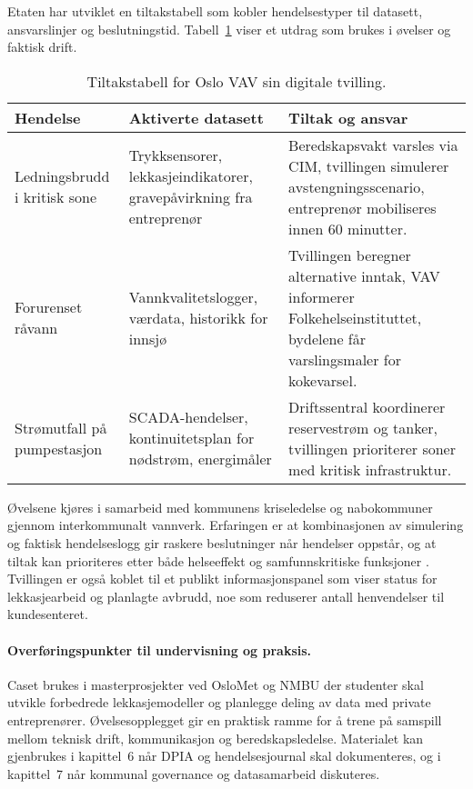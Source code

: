 Etaten har utviklet en tiltakstabell som kobler hendelsestyper til datasett, ansvarslinjer og beslutningstid. Tabell~\ref{tab:kap03-oslo-vav}
viser et utdrag som brukes i øvelser og faktisk drift.

\begin{table}[ht]
    \centering
    \caption{Tiltakstabell for Oslo VAV sin digitale tvilling.}
    \label{tab:kap03-oslo-vav}
    \begin{tabular}{p{}p{}p{}}
        \toprule
        \textbf{Hendelse} & \textbf{Aktiverte datasett} & \textbf{Tiltak og ansvar} \\
        \midrule
        Ledningsbrudd i kritisk sone & Trykksensorer, lekkasjeindikatorer, gravepåvirkning fra entreprenør & Beredskapsvakt varsles via CIM, tvillingen simulerer avstengningsscenario, entreprenør mobiliseres innen 60 minutter. \\
        Forurenset råvann & Vannkvalitetslogger, værdata, historikk for innsjø & Tvillingen beregner alternative inntak, VAV informerer Folkehelseinstituttet, bydelene får varslingsmaler for kokevarsel. \\
        Strømutfall på pumpestasjon & SCADA-hendelser, kontinuitetsplan for nødstrøm, energimåler & Driftssentral koordinerer reservestrøm og tanker, tvillingen prioriterer soner med kritisk infrastruktur. \\
        \bottomrule
    \end{tabular}
\end{table}

Øvelsene kjøres i samarbeid med kommunens kriseledelse og nabokommuner gjennom interkommunalt vannverk. Erfaringen er at
kombinasjonen av simulering og faktisk hendelseslogg gir raskere beslutninger når hendelser oppstår, og at tiltak kan prioriteres
etter både helseeffekt og samfunnskritiske funksjoner \citep{oslovav2023digital}. Tvillingen er også koblet til et publikt
informasjonspanel som viser status for lekkasjearbeid og planlagte avbrudd, noe som reduserer antall henvendelser til
kundesenteret.

\paragraph{Overføringspunkter til undervisning og praksis.} Caset brukes i masterprosjekter ved OsloMet og NMBU der studenter
skal utvikle forbedrede lekkasjemodeller og planlegge deling av data med private entreprenører. Øvelsesopplegget gir en
praktisk ramme for å trene på samspill mellom teknisk drift, kommunikasjon og beredskapsledelse. Materialet kan gjenbrukes i
kapittel~6 når DPIA og hendelsesjournal skal dokumenteres, og i kapittel~7 når kommunal governance og datasamarbeid diskuteres.

